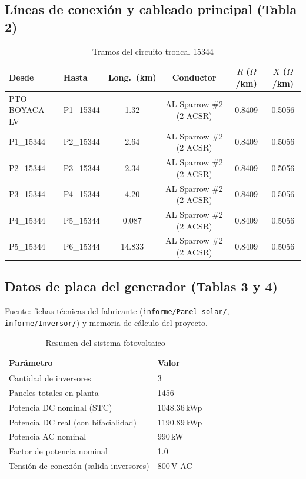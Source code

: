 \documentclass[11pt,a4paper]{article}
\begin{document}
\subsection{L\'ineas de conexi\'on y cableado principal (Tabla 2)}
\begin{table}[H]
\centering
\caption{Tramos del circuito troncal 15344}
\begin{tabular}{llcccc}
\toprule
Desde & Hasta & Long.\ (km) & Conductor & $R$ ($\Omega$/km) & $X$ ($\Omega$/km) \\
\midrule
PTO BOYACA LV & P1\_15344 & 1.32 & AL Sparrow \#2 (2 ACSR) & 0.8409 & 0.5056 \\
P1\_15344 & P2\_15344 & 2.64 & AL Sparrow \#2 (2 ACSR) & 0.8409 & 0.5056 \\
P2\_15344 & P3\_15344 & 2.34 & AL Sparrow \#2 (2 ACSR) & 0.8409 & 0.5056 \\
P3\_15344 & P4\_15344 & 4.20 & AL Sparrow \#2 (2 ACSR) & 0.8409 & 0.5056 \\
P4\_15344 & P5\_15344 & 0.087 & AL Sparrow \#2 (2 ACSR) & 0.8409 & 0.5056 \\
P5\_15344 & P6\_15344 & 14.833 & AL Sparrow \#2 (2 ACSR) & 0.8409 & 0.5056 \\
\bottomrule
\end{tabular}
\end{table}

\subsection{Datos de placa del generador (Tablas 3 y 4)}
Fuente: fichas t\'ecnicas del fabricante (\texttt{informe/Panel solar/}, \texttt{informe/Inversor/}) y memoria de c\'alculo del proyecto.

\begin{table}[H]
\centering
\caption{Resumen del sistema fotovoltaico}
\begin{tabular}{ll}
\toprule
Par\'ametro & Valor \\
\midrule
Cantidad de inversores & 3 \\
Paneles totales en planta & 1456 \\
Potencia DC nominal (STC) & 1048.36\,kWp \\
Potencia DC real (con bifacialidad) & 1190.89\,kWp \\
Potencia AC nominal & 990\,kW \\
Factor de potencia nominal & 1.0 \\
Tensi\'on de conexi\'on (salida inversores) & 800\,V AC \\
\bottomrule
\end{tabular}
\end{table}
\end{document}
